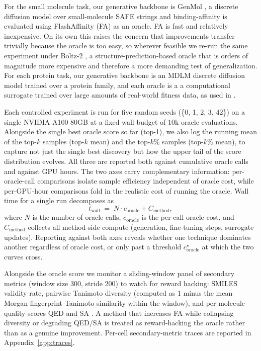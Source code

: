 \documentclass{article}
\begin{document}
For the small molecule task, our generative backbone is GenMol \citep{leeGenMolDrugDiscovery2025}, a discrete diffusion model over small-molecule SAFE strings \citep{noutahiGottaBeSAFE2023} and binding-affinity is evaluated using FlashAffinity (FA) \citep{jiangFlashAffinityBridgingAccuracySpeed} as an oracle. FA is fast and relatively inexpensive. On its own this raises the concern that improvements transfer trivially because the oracle is too easy, so wherever feasible we re-run the same experiment under Boltz-2 \citep{passaro2025boltz2}, a structure-prediction-based oracle that is orders of magnitude more expensive and therefore a more demanding test of generalization. For each protein task, our generative backbone is an MDLM discrete diffusion model \citep{sahooSimpleEffectiveMasked2024} trained over a protein family, and each oracle is a a computational surrogate trained over large amounts of real-world fitness data, as used in \cite{yangSteeringGenerativeModels2025}.

Each controlled experiment is run for five random seeds (\{0, 1, 2, 3, 42\}) on a single NVIDIA A100 80GB at a fixed wall budget of 10k oracle evaluations. Alongside the single best oracle score so far (top-1), we also log the running mean of the top-$k$ samples (top-$k$ mean) and the top-$k\%$ samples (top-$k\%$ mean), to capture not just the single best discovery but how the upper tail of the score distribution evolves. All three are reported both against cumulative oracle calls and against GPU hours. The two axes carry complementary information: per-oracle-call comparisons isolate sample efficiency independent of oracle cost, while per-GPU-hour comparisons fold in the realistic cost of running the oracle. Wall time for a single run decomposes as
\begin{equation}
t_{\text{wall}} \;=\; N \cdot c_{\text{oracle}} + C_{\text{method}},
\label{eq:wall-decomp}
\end{equation}
where $N$ is the number of oracle calls, $c_{\text{oracle}}$ is the per-call oracle cost, and $C_{\text{method}}$ collects all method-side compute (generation, fine-tuning steps, surrogate updates). Reporting against both axes reveals whether one technique dominates another regardless of oracle cost, or only past a threshold $c_{\text{oracle}}^\star$ at which the two curves cross.

Alongside the oracle score we monitor a sliding-window panel of secondary metrics (window size 300, stride 200) to watch for reward hacking: SMILES validity rate, pairwise Tanimoto diversity \citep{bajusz2015tanimoto} (computed as $1$ minus the mean Morgan-fingerprint Tanimoto similarity within the window), and per-molecule quality scores QED \citep{bickerton2012qed} and SA \citep{ertl2009sa}. A method that increases FA while collapsing diversity or degrading QED/SA is treated as reward-hacking the oracle rather than as a genuine improvement. Per-cell secondary-metric traces are reported in Appendix~\ref{app:traces}.
\end{document}
